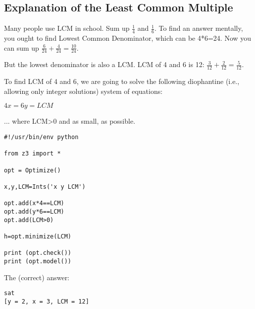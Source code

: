 \subsection{Explanation of the Least Common Multiple}

Many people use \ac{LCM} in school. Sum up $\frac{1}{4}$ and $\frac{1}{6}$.
To find an answer mentally, you ought to find Lowest Common Denominator, which can be 4*6=24.
Now you can sum up $\frac{6}{24} + \frac{4}{24} = \frac{10}{24}$.

But the lowest denominator is also a LCM.
LCM of 4 and 6 is 12: $\frac{3}{12} + \frac{2}{12} = \frac{5}{12}$.

To find LCM of 4 and 6, we are going to solve the following diophantine (i.e., allowing only integer solutions) system of equations:

$4x = 6y = LCM$

... where LCM>0 and as small, as possible.

\begin{lstlisting}
#!/usr/bin/env python

from z3 import *

opt = Optimize()

x,y,LCM=Ints('x y LCM')

opt.add(x*4==LCM)
opt.add(y*6==LCM)
opt.add(LCM>0)

h=opt.minimize(LCM)

print (opt.check())
print (opt.model())
\end{lstlisting}

The (correct) answer:

\begin{lstlisting}
sat
[y = 2, x = 3, LCM = 12]
\end{lstlisting}

